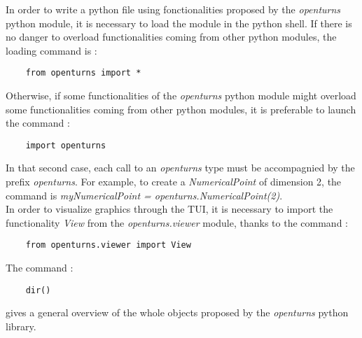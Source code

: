 \renewcommand{\filename}{docUC_Intro_PythonLib}
\renewcommand{\filetitle}{Loading the openturns python library}

\HeaderNNIILevel



In order to write a python file using fonctionalities proposed by the \emph{openturns} python module, it is necessary to load the module in the python shell. If there is no danger to overload functionalities coming from other python modules, the loading command is :

\begin{center}
  \begin{lstlisting}
    from openturns import *
  \end{lstlisting}
\end{center}
Otherwise, if some functionalities of the {\itshape openturns} python module might overload some functionalities coming from other python modules, it is preferable to launch the command :
\begin{center}
  \begin{lstlisting}
    import openturns
  \end{lstlisting}
\end{center}
In that second case, each call to an {\itshape openturns} type must be accompagnied by the prefix {\itshape openturns}. For example, to create a {\itshape NumericalPoint} of dimension 2, the command is {\itshape myNumericalPoint = openturns.NumericalPoint(2)}.\\

In order to visualize graphics through the TUI, it is necessary to import the functionality {\itshape View} from the  {\itshape openturns.viewer} module, thanks to the command :
\begin{center}
  \begin{lstlisting}
    from openturns.viewer import View
  \end{lstlisting}
\end{center}

The command :
\begin{center}
  \begin{lstlisting}
    dir()
  \end{lstlisting}
\end{center}
gives a general overview of the whole objects proposed by the \emph{openturns} python library.\\


